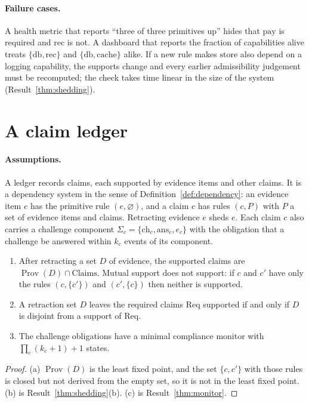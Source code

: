 \paragraph{Failure cases.} A health metric that reports ``three of three primitives up'' hides that $\mathrm{pay}$ is required and $\mathrm{rec}$ is not. A dashboard that reports the fraction of capabilities alive treats $\{\mathrm{db},\mathrm{rec}\}$ and $\{\mathrm{db},\mathrm{cache}\}$ alike. If a new rule makes $\mathrm{store}$ also depend on a logging capability, the supports change and every earlier admissibility judgement must be recomputed; the check takes time linear in the size of the system (Result~\ref{thm:shedding}).

\section{A claim ledger}

\paragraph{Assumptions.} A ledger records claims, each supported by evidence items and other claims. It is a dependency system in the sense of Definition~\ref{def:dependency}: an evidence item $e$ has the primitive rule $(e,\varnothing)$, and a claim $c$ has rules $(c,P)$ with $P$ a set of evidence items and claims. Retracting evidence $e$ sheds $e$. Each claim $c$ also carries a challenge component $\Sigma_c=\{\mathrm{ch}_c,\mathrm{ans}_c,e_c\}$ with the obligation that a challenge be answered within $k_c$ events of its component.

\begin{newresult}\label{prop:worked-ledger}
\begin{enumerate}[nosep,label=(\alph*)]
  \item After retracting a set $D$ of evidence, the supported claims are $\operatorname{Prov}(D)\cap\mathrm{Claims}$. Mutual support does not support: if $c$ and $c'$ have only the rules $(c,\{c'\})$ and $(c',\{c\})$ then neither is supported.
  \item A retraction set $D$ leaves the required claims $\mathrm{Req}$ supported if and only if $D$ is disjoint from a support of $\mathrm{Req}$.
  \item The challenge obligations have a minimal compliance monitor with $\prod_c(k_c+1)+1$ states.
\end{enumerate}
\end{newresult}
\begin{proof}
(a) $\operatorname{Prov}(D)$ is the least fixed point, and the set $\{c,c'\}$ with those rules is closed but not derived from the empty set, so it is not in the least fixed point. (b) is Result~\ref{thm:shedding}(b). (c) is Result~\ref{thm:monitor}.
\end{proof}

